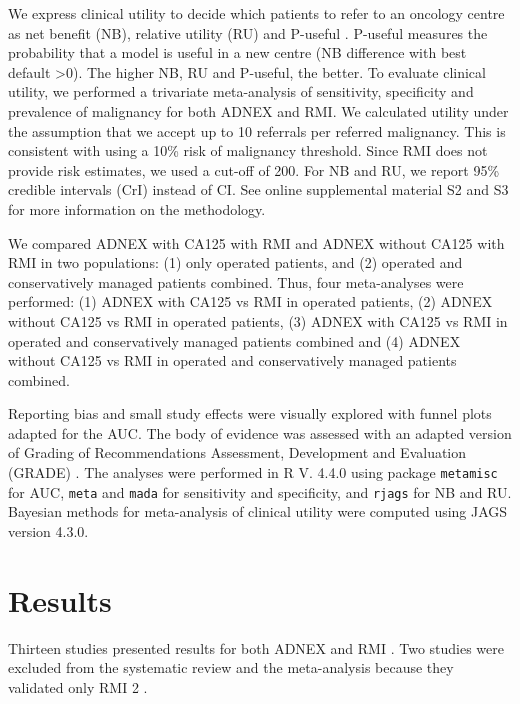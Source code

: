 We express clinical utility to decide which patients to refer to an oncology centre
as net benefit (\gls{NB}), relative utility (\gls{RU}) and P-useful
 \cite{vickersDecisionCurveAnalysis2006,vickersNetBenefitApproaches2016,wynantsRandomeffectsMetaanalysisClinical2018,bakerPuttingRiskPrediction2009,bakerUsingRelativeUtility2009}.
P-useful measures the probability that a model is useful in a new centre (\gls{NB}
difference with best default >0). The higher \gls{NB}, \gls{RU} and P-useful, the better. To
evaluate clinical utility, we performed a trivariate meta-analysis of sensitivity,
specificity and prevalence of malignancy for both \gls{ADNEX} and \gls{RMI}. We calculated
utility under the assumption that we accept up to 10 referrals per referred
malignancy. This is consistent with using a 10\% risk of malignancy threshold. Since
\gls{RMI} does not provide risk estimates, we used a cut-off of 200. For \gls{NB} and \gls{RU}, we
report 95\% credible intervals (\gls{CrI}) instead of \gls{CI}. See online supplemental material
S2 and S3 for more information on the methodology.

We compared \gls{ADNEX} with CA125 with \gls{RMI} and \gls{ADNEX} without CA125 with \gls{RMI} in two
populations: (1) only operated patients, and (2) operated and conservatively managed
patients combined. Thus, four meta-analyses were performed: (1) \gls{ADNEX} with CA125 vs
\gls{RMI} in operated patients, (2) \gls{ADNEX} without CA125 vs \gls{RMI} in operated patients, (3)
\gls{ADNEX} with CA125 vs \gls{RMI} in operated and conservatively managed patients combined and
(4) \gls{ADNEX} without CA125 vs \gls{RMI} in operated and conservatively managed patients
combined.

Reporting bias and small study effects were visually explored with funnel plots
adapted for the \gls{AUC}. The body of evidence was assessed with an adapted version of
Grading of Recommendations Assessment, Development and Evaluation (\gls{GRADE})
 \cite{guyattGRADEEmergingConsensus2008}. The analyses were performed in R V. 4.4.0
using package \texttt{metamisc} for \gls{AUC}, \texttt{meta} and \texttt{mada} for sensitivity and
specificity, and \texttt{rjags} for \gls{NB} and \gls{RU}. Bayesian methods for meta-analysis of clinical
utility were computed using \gls{JAGS} version 4.3.0.

\section{Results}

Thirteen studies presented results for both \gls{ADNEX} and \gls{RMI}
 \cite{vancalsterValidationModelsDiagnose2020,diazOvarianTumorsRisk2017a,tugPreoperativeDiscriminatingPerformance2020,behnamfarComparisonUltrasoundTumor2022,meysEstimatingRiskMalignancy2017,qianComparisonDiagnosticPerformances2021,sandalComparisionRiskMalignancy2018a,szubertPerformanceSelectedModels2020,wangEvaluatingRiskMalignancy2023,borgesProspectiveExternalValidation2024,ounPreoperativeRiskAssessment2023,poonyakanokProspectiveComparativeTrial2023,vilendecicAccuracyIOTASimple2023}.
Two studies were excluded from the systematic review and the meta-analysis because
they validated only \gls{RMI} 2
 \cite{poonyakanokProspectiveComparativeTrial2023,vilendecicAccuracyIOTASimple2023}.

